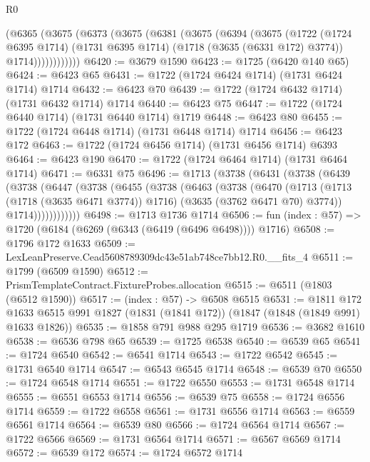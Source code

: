 \begin{lexlean}{R0}
\begin{coremodule}
          (@6365
            (@3675
              (@6373
                (@3675
                  (@6381
                    (@3675
                      (@6394
                        (@3675
                          (@1722
                            (@1724 @6395 @1714)
                            (@1731 @6395 @1714)
                            (@1718 (@3635 (@6331 @172) @3774))
                            @1714))))))))))))
@6420 := @3679 @1590
@6423 := @1725 (@6420 @140 @65)
@6424 := @6423 @65
@6431 := @1722 (@1724 @6424 @1714) (@1731 @6424 @1714) @1714
@6432 := @6423 @70
@6439 := @1722 (@1724 @6432 @1714) (@1731 @6432 @1714) @1714
@6440 := @6423 @75
@6447 := @1722 (@1724 @6440 @1714) (@1731 @6440 @1714) @1719
@6448 := @6423 @80
@6455 := @1722 (@1724 @6448 @1714) (@1731 @6448 @1714) @1714
@6456 := @6423 @172
@6463 := @1722 (@1724 @6456 @1714) (@1731 @6456 @1714) @6393
@6464 := @6423 @190
@6470 := @1722 (@1724 @6464 @1714) (@1731 @6464 @1714)
@6471 := @6331 @75
@6496 := @1713
    (@3738
      (@6431
        (@3738
          (@6439
            (@3738
              (@6447
                (@3738
                  (@6455
                    (@3738
                      (@6463
                        (@3738
                          (@6470
                            (@1713
                              (@1713 (@1718 (@3635 @6471 @3774)) @1716)
                              (@3635 (@3762 @6471 @70) @3774))
                            @1714))))))))))))
@6498 := @1713 @1736 @1714
@6506 := fun (index : @57) => @1720 (@6184 (@6269 (@6343 (@6419 (@6496 @6498)))) @1716)
@6508 := @1796 @172 @1633
@6509 := LexLeanPreserve.Cead5608789309dc43e51ab748ce7bb12.R0.__fits_4
@6511 := @1799 (@6509 @1590)
@6512 := PrismTemplateContract.FixtureProbes.allocation
@6515 := @6511 (@1803 (@6512 @1590))
@6517 := (index : @57) -> @6508 @6515
@6531 := @1811
    @172
    @1633
    @6515
    @991
    @1827
    (@1831 (@1841 @172))
    (@1847 (@1848 (@1849 @991) @1633 @1826))
@6535 := @1858 @791 @988 @295 @1719
@6536 := @3682 @1610
@6538 := @6536 @798 @65
@6539 := @1725 @6538
@6540 := @6539 @65
@6541 := @1724 @6540
@6542 := @6541 @1714
@6543 := @1722 @6542
@6545 := @1731 @6540 @1714
@6547 := @6543 @6545 @1714
@6548 := @6539 @70
@6550 := @1724 @6548 @1714
@6551 := @1722 @6550
@6553 := @1731 @6548 @1714
@6555 := @6551 @6553 @1714
@6556 := @6539 @75
@6558 := @1724 @6556 @1714
@6559 := @1722 @6558
@6561 := @1731 @6556 @1714
@6563 := @6559 @6561 @1714
@6564 := @6539 @80
@6566 := @1724 @6564 @1714
@6567 := @1722 @6566
@6569 := @1731 @6564 @1714
@6571 := @6567 @6569 @1714
@6572 := @6539 @172
@6574 := @1724 @6572 @1714

\end{coremodule}
\end{lexlean}
